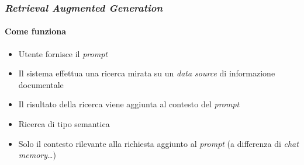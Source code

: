 \begin{frame}[t] \frametitle{\emph{Retrieval Augmented Generation}}
\framesubtitle{Come funziona}
{\normalsize
    \begin{minipage}[t]{\textwidth}
        \begin{itemize}[leftmargin=10pt,align=right]
            \item[\alertedcircled{1}] Utente fornisce il \textit{prompt}
            \item[\alertedcircled{2}] Il sistema effettua una ricerca mirata su un \textit{data source} di informazione documentale
            \item[\alertedcircled{3}] Il risultato della ricerca viene aggiunta al contesto del \textit{prompt}
        \end{itemize}
        \vspace*{.3cm}
        \begin{itemize}[leftmargin=10pt,align=right]
            \item[\alert{\faExclamationTriangle}] Ricerca di tipo \alert{semantica}
            \item[\alert{\faExclamationTriangle}] Solo il contesto rilevante alla richiesta aggiunto al \textit{prompt} (a differenza di \textit{chat memory}\ldots)
        \end{itemize}
    \end{minipage}
}
\end{frame}
%
